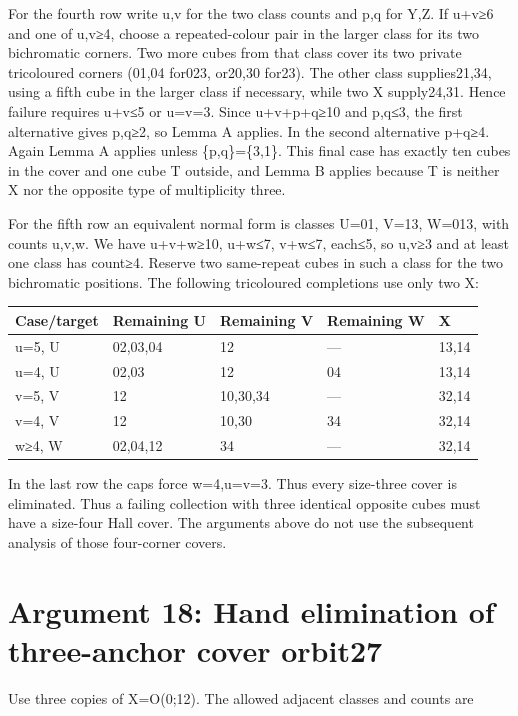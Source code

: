\documentclass[
  10pt,
]{article}
\begin{document}
For the fourth row write u,v for the two class counts and p,q for Y,Z.
If u+v≥6 and one of u,v≥4, choose a repeated-colour pair in the larger
class for its two bichromatic corners. Two more cubes from that class
cover its two private tricoloured corners (01,04 for023, or20,30 for23).
The other class supplies21,34, using a fifth cube in the larger class if
necessary, while two X supply24,31. Hence failure requires u+v≤5 or
u=v=3. Since u+v+p+q≥10 and p,q≤3, the first alternative gives p,q≥2, so
Lemma A applies. In the second alternative p+q≥4. Again Lemma A applies
unless \{p,q\}=\{3,1\}. This final case has exactly ten cubes in the
cover and one cube T outside, and Lemma B applies because T is neither X
nor the opposite type of multiplicity three.

For the fifth row an equivalent normal form is classes U=01, V=13,
W=013, with counts u,v,w. We have u+v+w≥10, u+w≤7, v+w≤7, each≤5, so
u,v≥3 and at least one class has count≥4. Reserve two same-repeat cubes
in such a class for the two bichromatic positions. The following
tricoloured completions use only two X:

\begin{longtable}[]{@{}lllll@{}}
\toprule\noalign{}
Case/target & Remaining U & Remaining V & Remaining W & X \\
\midrule\noalign{}
\endhead
\bottomrule\noalign{}
\endlastfoot
u=5, U & 02,03,04 & 12 & --- & 13,14 \\
u=4, U & 02,03 & 12 & 04 & 13,14 \\
v=5, V & 12 & 10,30,34 & --- & 32,14 \\
v=4, V & 12 & 10,30 & 34 & 32,14 \\
w≥4, W & 02,04,12 & 34 & --- & 32,14 \\
\end{longtable}

In the last row the caps force w=4,u=v=3. Thus every size-three cover is
eliminated. Thus a failing collection with three identical opposite
cubes must have a size-four Hall cover. The arguments above do not use
the subsequent analysis of those four-corner covers.

\hypertarget{arg-18}{%
\section{Argument 18: Hand elimination of three-anchor cover
orbit27}\label{arg-18}}

Use three copies of X=O(0;12). The allowed adjacent classes
and counts are
\end{document}
